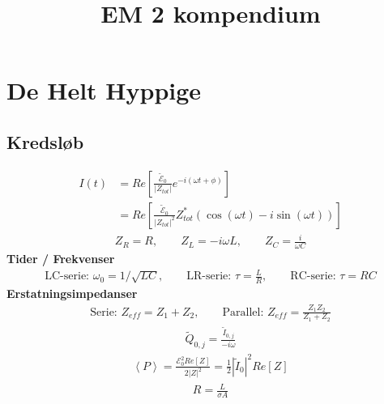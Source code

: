 \documentclass[a4paper]{article}
\title{EM 2 kompendium}
\begin{document}
    \maketitle
    \tableofcontents
    \newpage

    \section{De Helt Hyppige}
    \subsection{Kredsløb}
    \begin{align*}
        I(t) &= Re \left[\frac{\tilde{\mathcal{E}}_0}{\left| Z_{tot} \right| } e^{-i{(\omega t + \phi )}}\right] \\
        &= Re \left[\frac{\tilde{\mathcal{E}}_0}{ \left| Z_{tot}  \right|^{2}   } Z_{tot} ^{\ast} \left( \cos (\omega t) - i \sin (\omega t) \right)\right] 
    \end{align*}
    \begin{align*}
        Z_R = R,\qquad Z_L = -i \omega L, \qquad Z_C = \frac{i}{\omega C}\tag{K(61)}
    \end{align*}
    \textbf{Tider / Frekvenser}
    \begin{align*}
        \text{LC-serie: } \omega_0 = 1 / \sqrt{LC}, \qquad \text{LR-serie: } \tau = \frac{L}{R}, \qquad \text{RC-serie: } \tau = RC
    \end{align*} 
    \textbf{Erstatningsimpedanser}
    \begin{align*}
        \text{Serie: }Z_{eff} = Z_1 + Z_2, \qquad \text{Parallel: } Z_{eff} = \frac{Z_{1}Z_2}{Z_1 + Z_{2}}
    \end{align*} 
    \begin{align*}
        \tilde{Q}_{0, j} = \frac{\tilde{I}_{0, j}}{-i \omega } \tag{K(58)}
    \end{align*}
    \begin{align*}
        \boxed{\left\langle P \right\rangle = \frac{\mathcal{E}_0 ^2 Re[Z] }{2|Z|^2} = \frac{1}{2}\left| \tilde{I}_0 \right| ^{2} Re[Z]} \tag{K(69)}
    \end{align*}
    \begin{align*}
        R = \frac{L}{\sigma A} \tag{p. 300}
    \end{align*}
\end{document}
